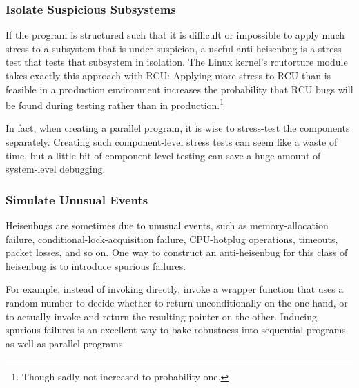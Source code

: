 \subsubsection{Isolate Suspicious Subsystems}
\label{sec:debugging:Isolate Suspicious Subsystems}

If the program is structured such that it is difficult or impossible
to apply much stress to a subsystem that is under suspicion,
a useful anti-heisenbug is a stress test that tests that subsystem in
isolation.
The Linux kernel's rcutorture module takes exactly this approach with RCU:
Applying more stress to RCU than is feasible in a production environment
increases the probability that RCU bugs will be found during testing
rather than in production.\footnote{
	Though sadly not increased to probability one.}

In fact, when creating a parallel program, it is wise to stress-test
the components separately.
Creating such component-level stress tests can seem like a waste of time,
but a little bit of component-level testing can save a huge amount
of system-level debugging.

\subsubsection{Simulate Unusual Events}
\label{sec:debugging:Simulate Unusual Events}

Heisenbugs are sometimes due to unusual events, such as
memory-allocation failure, conditional-lock-acquisition failure,
CPU-hotplug operations, timeouts, packet losses, and so on.
One way to construct an anti-heisenbug for this class of heisenbug
is to introduce spurious failures.

For example, instead of invoking  directly, invoke
a wrapper function that uses a random number to decide whether
to return  unconditionally on the one hand, or to actually
invoke  and return the resulting pointer on the other.
Inducing spurious failures is an excellent way to bake robustness into
sequential programs as well as parallel programs.

\QuickQuizEnd

